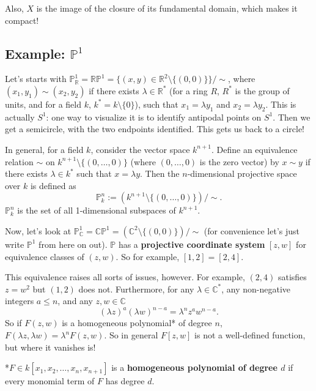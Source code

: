 \documentclass[12pt]{article}
\newcommand{\cx}{\mathbb{C}}
\newcommand{\real}{\mathbb{R}}
\newcommand{\p}{\mathbb{P}}
\theoremstyle{definition}
\theoremstyle{remark}
\begin{document}
Also, $X$ is the image of the closure of its fundamental domain, which makes it compact!
\subsection{Example: \texorpdfstring{$\p^1$}{P1}}
Let's starts with $\p_{\real}^1=\mathbb{RP}^1=\{(x,y)\in\real^2\setminus\{(0,0)\}\}/\sim$, where $(x_1,y_1)\sim(x_2,y_2)$ if there exists $\lambda\in\real^*$ (for a ring $R$, $R^*$ is the group of units, and for a field $k$, $k^*=k\setminus\{0\}$), such that $x_1=\lambda y_1$ and $x_2=\lambda y_2$. This is actually $S^1$: one way to visualize it is to identify antipodal points on $S^1$. Then we get a semicircle, with the two endpoints identified. This gets us back to a circle!

In general, for a field $k$, consider the vector space $k^{n+1}$. Define an equivalence relation $\sim$ on $k^{n+1}\setminus\{(0,\dotsc,0)\}$ (where $(0,\dotsc,0)$ is the zero vector) by $x\sim y$ if there exists $\lambda\in k^*$ such that $x=\lambda y$. Then the $n$-dimensional projective space over $k$ is defined as
\begin{equation}
    \p_k^n:=\left(k^{n+1}\setminus\{(0,\dotsc,0)\}\right)\big/\sim.
\end{equation}
$\p_k^n$ is the set of all 1-dimensional subspaces of $k^{n+1}$.

Now, let's look at $\p_{\cx}^1=\mathbb{CP}^1=\left(\cx^2\setminus\{(0,0)\}\right)\big/\sim$ (for convenience let's just write $\p^1$ from here on out). $\p$ has a \textbf{projective coordinate system} $[z,w]$ for equivalence classes of $(z,w)$. So for example, $[1,2]=[2,4]$. 

This equivalence raises all sorts of issues, however. For example, $(2,4)$ satisfies $z=w^2$ but $(1,2)$ does not. Furthermore, for any $\lambda\in\cx^*$, any non-negative integers $a\leq n$, and any $z,w\in\cx$
\begin{equation}
    (\lambda z)^a(\lambda w)^{n-a}=\lambda^nz^aw^{n-a}.
\end{equation}
So if $F(z,w)$ is a homogeneous polynomial* of degree $n$, $F(\lambda z,\lambda w)=\lambda^nF(z,w)$. So in general $F[z,w]$ is not a well-defined function, but where it vanishes is! 

*$F\in k[x_1,x_2,\dotsc,x_n,x_{n+1}]$ is a \textbf{homogeneous polynomial of degree $d$} if every monomial term of $F$ has degree $d$.
\end{document}
